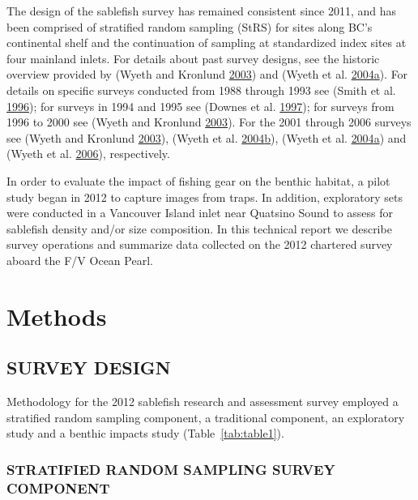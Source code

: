 \documentclass[12pt]{article}\usepackage[]{graphicx}\usepackage[]{color}
\begin{document}
The design of the sablefish survey has remained consistent since 2011, and has been comprised of stratified random sampling (StRS) for sites along BC's continental shelf and the continuation of sampling at standardized index sites at four mainland inlets. For details about past survey designs, see the historic overview provided by (Wyeth and Kronlund \protect\hyperlink{ref-Wyeth2003}{2003}) and (Wyeth et al. \protect\hyperlink{ref-Wyeth2004b}{2004}\protect\hyperlink{ref-Wyeth2004b}{a}). For details on specific surveys conducted from 1988 through 1993 see (Smith et al. \protect\hyperlink{ref-Smith1996}{1996}); for surveys in 1994 and 1995 see (Downes et al. \protect\hyperlink{ref-Downes1997}{1997}); for surveys from 1996 to 2000 see (Wyeth and Kronlund \protect\hyperlink{ref-Wyeth2003}{2003}). For the 2001 through 2006 surveys see (Wyeth and Kronlund \protect\hyperlink{ref-Wyeth2003}{2003}), (Wyeth et al. \protect\hyperlink{ref-Wyeth2004a}{2004}\protect\hyperlink{ref-Wyeth2004a}{b}), (Wyeth et al. \protect\hyperlink{ref-Wyeth2004b}{2004}\protect\hyperlink{ref-Wyeth2004b}{a}) and (Wyeth et al. \protect\hyperlink{ref-Wyeth2006}{2006}), respectively.

In order to evaluate the impact of fishing gear on the benthic habitat, a pilot study began in 2012 to capture images from traps. In addition, exploratory sets were conducted in a Vancouver Island inlet near Quatsino Sound to assess for sablefish density and/or size composition. In this technical report we describe survey operations and summarize data collected on the 2012 chartered survey aboard the F/V Ocean Pearl.

\hypertarget{methods}{%
\section{Methods}\label{methods}}

\hypertarget{survey-design}{%
\subsection{SURVEY DESIGN}\label{survey-design}}

Methodology for the 2012 sablefish research and assessment survey employed a stratified random sampling component, a traditional component, an exploratory study and a benthic impacts study (Table~\ref{tab:table1}).

\hypertarget{stratified-random-sampling-survey-component}{%
\subsubsection{STRATIFIED RANDOM SAMPLING SURVEY COMPONENT}\label{stratified-random-sampling-survey-component}}
\end{document}
